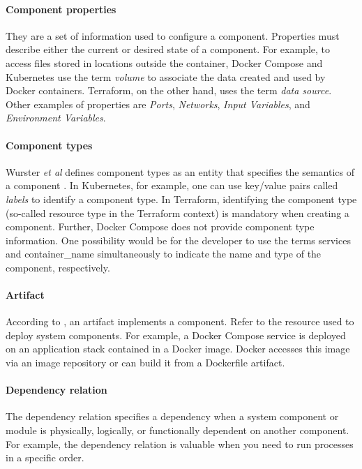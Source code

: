 \documentclass[sigconf]{acmart}
\begin{document}
\paragraph{\textbf{Component properties}} They are a set of information used to configure a component. Properties must describe either the current or desired state of a component. For example, to access files stored in locations outside the container, Docker Compose and Kubernetes use the term \textit{volume} to associate the data created and used by Docker containers. Terraform, on the other hand, uses the term \textit{data source}. Other examples of properties are \textit{Ports}, \textit{Networks}, \textit{Input Variables}, and \textit{Environment Variables}.

\paragraph{\textbf{Component types}} Wurster \textit{et al} defines component types as an entity that specifies the semantics of a component \cite{wurster2019}. In Kubernetes, for example, one can use key/value pairs called \textit{labels} to identify a component type. In Terraform, identifying the component type (so-called resource type in the Terraform context) is mandatory when creating a component. 
Further, Docker Compose does not provide component type information. One possibility would be for the developer to use the terms services and container\_name simultaneously to indicate the name and type of the component, respectively.

\paragraph{\textbf{Artifact}} According to \cite{wurster2019}, an artifact implements a component. Refer to the resource used to deploy system components. For example, a Docker Compose service is deployed on an application stack contained in a Docker image. Docker accesses this image via an image repository or can build it from a Dockerfile artifact.

\paragraph{\textbf{Dependency relation}} The dependency relation specifies a dependency when a system component or module is physically, logically, or functionally dependent on another component. For example, the dependency relation is valuable when you need to run processes in a specific order.
\end{document}
